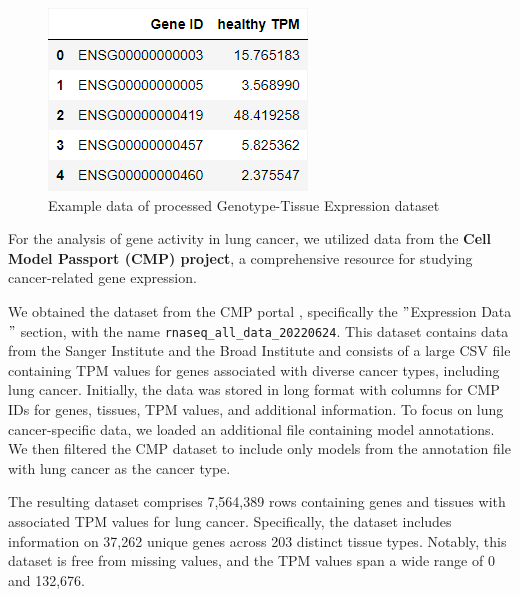 \begin{figure}[h]
    \centering
    \includegraphics[height=\dfheight]{figures/03_01_GTEX_healthy_mean}
    \caption{Example data of processed Genotype-Tissue Expression dataset}
    \label{fig:03_01_df_GTEX_healthy_mean}
\end{figure}




For the analysis of gene activity in lung cancer, we utilized data from the \textbf{Cell Model Passport (CMP) project},
a comprehensive resource for studying cancer-related gene expression.

We obtained the dataset from the CMP portal \cite{cmp_download}, specifically the $"$Expression Data$"$ section,
with the name \texttt{rnaseq\_all\_data\_20220624}.
This dataset contains data from the Sanger Institute and the Broad Institute and
consists of a large CSV file containing TPM values for genes associated with diverse cancer types, including lung cancer.
Initially, the data was stored in long format with columns for CMP IDs for genes, tissues, TPM values, and additional information.
To focus on lung cancer-specific data, we loaded an additional file containing model annotations. \cite{cmp_tissue_models}
We then filtered the CMP dataset to include only models from the annotation file with lung cancer as the cancer type.

The resulting dataset comprises 7,564,389 rows containing genes and tissues with associated TPM values for lung cancer.
Specifically, the dataset includes information on 37,262 unique genes across 203 distinct tissue types.
Notably, this dataset is free from missing values, and the TPM values span a wide range of 0 and 132,676.

